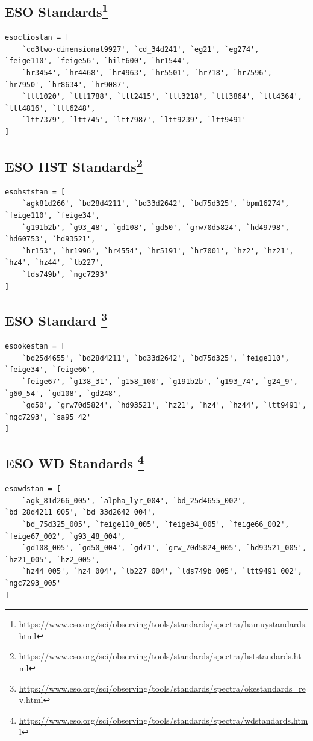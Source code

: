 \documentclass[twocolumn, linenumbers]{aastex631}
\begin{document}
\subsection*{ESO \citet{1992PASP..104..533H, 1994PASP..106..566H} Standards\footnote{\url{https://www.eso.org/sci/observing/tools/standards/spectra/hamuystandards.html}}}
\begin{verbatim}
esoctiostan = [
    `cd3two-dimensional9927', `cd_34d241', `eg21', `eg274', `feige110', `feige56', `hilt600', `hr1544',
    `hr3454', `hr4468', `hr4963', `hr5501', `hr718', `hr7596', `hr7950', `hr8634', `hr9087',
    `ltt1020', `ltt1788', `ltt2415', `ltt3218', `ltt3864', `ltt4364', `ltt4816', `ltt6248',
    `ltt7379', `ltt745', `ltt7987', `ltt9239', `ltt9491'
]
\end{verbatim}

\subsection*{ESO \citet{1995AJ....110.1316B, 1996AJ....111.1743B} HST Standards\footnote{\url{https://www.eso.org/sci/observing/tools/standards/spectra/hststandards.html}}}
\begin{verbatim}
esohststan = [
    `agk81d266', `bd28d4211', `bd33d2642', `bd75d325', `bpm16274', `feige110', `feige34',
    `g191b2b', `g93_48', `gd108', `gd50', `grw70d5824', `hd49798', `hd60753', `hd93521',
    `hr153', `hr1996', `hr4554', `hr5191', `hr7001', `hz2', `hz21', `hz4', `hz44', `lb227',
    `lds749b', `ngc7293'
]
\end{verbatim}

\subsection*{ESO \citet{1990AJ.....99.1621O} Standard \footnote{\url{https://www.eso.org/sci/observing/tools/standards/spectra/okestandards_rev.html}}}

\begin{verbatim}
esookestan = [
    `bd25d4655', `bd28d4211', `bd33d2642', `bd75d325', `feige110', `feige34', `feige66',
    `feige67', `g138_31', `g158_100', `g191b2b', `g193_74', `g24_9', `g60_54', `gd108', `gd248',
    `gd50', `grw70d5824', `hd93521', `hz21', `hz4', `hz44', `ltt9491', `ngc7293', `sa95_42'
]
\end{verbatim}

\subsection*{ESO \citet{1995AJ....110.1316B} WD Standards \footnote{\url{https://www.eso.org/sci/observing/tools/standards/spectra/wdstandards.html}}}
\begin{verbatim}
esowdstan = [
    `agk_81d266_005', `alpha_lyr_004', `bd_25d4655_002', `bd_28d4211_005', `bd_33d2642_004',
    `bd_75d325_005', `feige110_005', `feige34_005', `feige66_002', `feige67_002', `g93_48_004',
    `gd108_005', `gd50_004', `gd71', `grw_70d5824_005', `hd93521_005', `hz21_005', `hz2_005',
    `hz44_005', `hz4_004', `lb227_004', `lds749b_005', `ltt9491_002', `ngc7293_005'
]
\end{verbatim}
\end{document}
